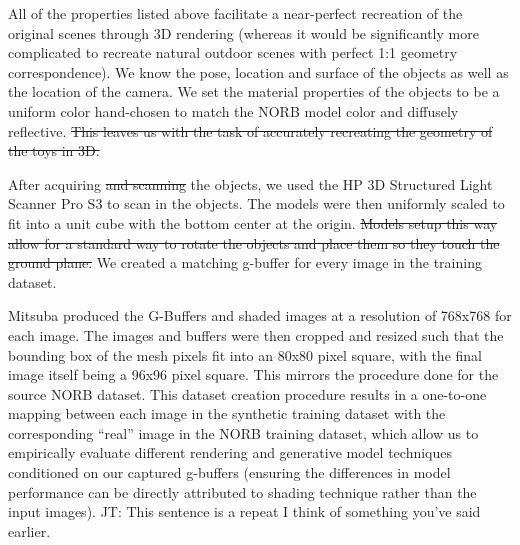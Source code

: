 \documentclass[10pt,twocolumn,letterpaper]{article}
\newcommand{\tompson}[1]{{\color{green} JT: #1}}
\begin{document}
 All of the properties listed above facilitate a near-perfect recreation of the original scenes through 3D rendering (whereas it would be significantly more complicated to recreate natural outdoor scenes with perfect 1:1 geometry correspondence). We know the pose, location and surface of the objects as well as the location of the camera. We set the material properties of the objects to be a uniform color hand-chosen to match the NORB model color %
 and diffusely reflective. \sout{This leaves us with the task of accurately recreating the geometry of the toys in 3D.}
 
 After acquiring \sout{and scanning} the objects, %
we used the HP 3D Structured Light Scanner Pro S3\cite{HPSCANNER} to scan in the objects. The models were then
uniformly scaled to fit into a unit cube with the bottom center at the origin.  \sout{Models setup this way allow for a standard way to rotate the objects and place them so they touch the ground plane.} We created a matching g-buffer for every image in the training dataset.  

Mitsuba produced the G-Buffers and shaded images at a resolution of 768x768 for each image.  The images and buffers were then cropped and resized such that the bounding box of the mesh pixels fit into an 80x80 pixel square, with the final image itself being a 96x96 pixel square. This mirrors the procedure done for the source NORB dataset. %
 This dataset creation procedure results in a one-to-one mapping between each image in the synthetic training dataset with the corresponding ``real'' image in the NORB training dataset, which allow us to empirically evaluate different rendering and generative model techniques conditioned on our captured g-buffers (ensuring the differences in model performance can be directly attributed to shading technique rather than the input images). \tompson{This sentence is a repeat I think of something you've said earlier.}
\end{document}
